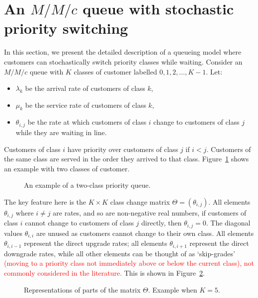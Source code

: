\documentclass{article}
\begin{document}
\section{An $M/M/c$ queue with stochastic priority switching}\label{sec:system}
In this section, we present the detailed description of a queueing model where
customers can stochastically switch priority classes while waiting.
Consider an $M/M/c$ queue with $K$ classes of customer labelled
$0, 1, 2, \dots, K-1$. Let:

\begin{itemize}
  \item $\lambda_k$ be the arrival rate of customers of class $k$,
  \item $\mu_k$ be the service rate of customers of class $k$,
  \item $\theta_{i,j}$ be the rate at which customers of class $i$ change
  to customers of class $j$ while they are waiting in line.
\end{itemize}

Customers of class $i$ have priority over customers of class $j$ if $i < j$.
Customers of the same class are served in the order they arrived to that class.
Figure~\ref{fig:twoclass_example} shows an example with two classes of customer.

\begin{figure}
\begin{center}

\end{center}
\caption{An example of a two-class priority queue.}
\label{fig:twoclass_example}
\end{figure}

The key feature here is the $K \times K$ class change matrix
$\Theta = (\theta_{i,j})$.
All elements $\theta_{i,j}$ where $i \neq j$ are rates, and so are non-negative
real numbers, if customers of class $i$ cannot change to customers of class $j$
directly, then $\theta_{i,j} = 0$.
The diagonal values $\theta_{i,i}$ are unused as customers cannot change to
their own class.
All elements $\theta_{i,i-1}$ represent the direct upgrade rates; all elements
$\theta_{i,i+1}$ represent the direct downgrade rates, while all other elements
can be thought of as `skip-grades' \textcolor{red}{(moving to a priority class
not immediately above or below the current class), not commonly considered in
the literature.}
This is shown in Figure~\ref{fig:skipgrades}.

\begin{figure}
\begin{center}

\end{center}
\caption{Representations of parts of the matrix $\Theta$. Example when $K=5$.}
\label{fig:skipgrades}
\end{figure}
\end{document}
